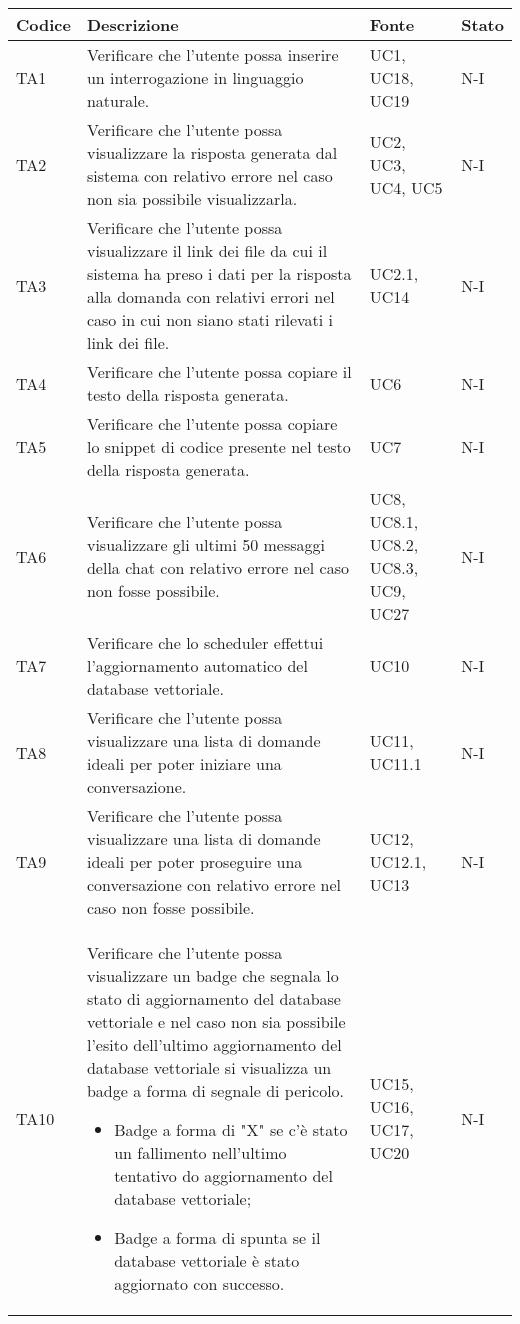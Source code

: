\begin{table}[h!]
    \centering
    \renewcommand{\arraystretch}{1.5} %
    \begin{tabularx}{\textwidth}{|p{}|X|p{}|p{}|}\hline
    \rowcolor[HTML]{FFD700}
    \textbf{Codice} & \textbf{Descrizione} & \textbf{Fonte} & \textbf{Stato} \\ \hline
    TA1 & Verificare che l'utente possa inserire un interrogazione in linguaggio naturale. & UC1, UC18, UC19 & N-I \\ \hline
    TA2 & Verificare che l'utente possa visualizzare la risposta generata dal sistema con relativo errore nel caso non sia possibile visualizzarla. & UC2, UC3, UC4, UC5 & N-I \\ \hline
    TA3 & Verificare che l'utente possa visualizzare il link dei file da cui il sistema ha preso i dati per la risposta alla domanda con relativi errori nel caso in cui non siano stati rilevati i link dei file.  & UC2.1, UC14 & N-I \\ \hline
    TA4 & Verificare che l'utente possa copiare il testo della risposta generata. & UC6 & N-I \\ \hline
    TA5 & Verificare che l'utente possa copiare lo snippet di codice presente nel testo della risposta generata. & UC7 & N-I \\ \hline
    TA6 & Verificare che l'utente possa visualizzare gli ultimi 50 messaggi della chat con relativo errore nel caso non fosse possibile.  & UC8, UC8.1, UC8.2, UC8.3, UC9, UC27 & N-I \\ \hline
    TA7 & Verificare che lo scheduler effettui l'aggiornamento automatico del database vettoriale. & UC10 & N-I \\ \hline
    TA8 & Verificare che l'utente possa visualizzare una lista di domande ideali per poter iniziare una conversazione. & UC11, UC11.1 & N-I \\ \hline
    TA9 & Verificare che l'utente possa visualizzare una lista di domande ideali per poter proseguire una conversazione con relativo errore nel caso non fosse possibile. & UC12, UC12.1, UC13 & N-I \\ \hline
    TA10 & Verificare che l'utente possa visualizzare un badge che segnala lo stato di aggiornamento del database vettoriale e nel caso non sia possibile l'esito dell'ultimo aggiornamento del database vettoriale si visualizza un badge a forma di segnale di pericolo.
    \begin{itemize}
        \item Badge a forma di "X" se c'è stato un fallimento nell'ultimo tentativo do aggiornamento del database vettoriale;
        \item Badge a forma di spunta se il database vettoriale è stato aggiornato con successo.
    \end{itemize} 
        & UC15, UC16, UC17, UC20 & N-I \\ \hline

    \end{tabularx}
\end{table}

